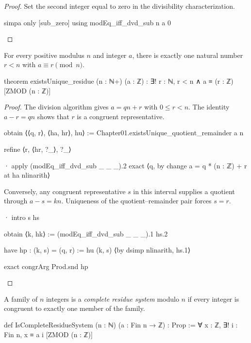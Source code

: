 \begin{proof}
  Set the second integer equal to zero in the divisibility characterization.

  \begin{lean}
    simpa only [sub_zero] using modEq_iff_dvd_sub n a 0
  \end{lean}
\end{proof}

\begin{theorem}
  \label{ent:thm:existsunique-residue}
  For every positive modulus $n$ and integer $a$, there is exactly one natural number $r<n$ with
  $a\equiv r\pmod n$.

  \begin{lean}
    theorem existsUnique_residue (n : ℕ+) (a : ℤ) :
        ∃! r : ℕ, r < n ∧ a ≡ (r : ℤ) [ZMOD (n : ℤ)]
  \end{lean}
\end{theorem}

\begin{proof}
  The division algorithm gives $a=qn+r$ with $0\le r<n$.
  The identity $a-r=qn$ shows that $r$ is a congruent representative.

  \begin{lean}
    obtain ⟨⟨q, r⟩, ⟨ha, hr⟩, hu⟩ := Chapter01.existsUnique_quotient_remainder a n

    refine ⟨r, ⟨hr, ?_⟩, ?_⟩

    · apply (modEq_iff_dvd_sub _ _ _).2
      exact ⟨q, by
          change a = q * (n : ℤ) + r at ha
          nlinarith⟩
  \end{lean}

  Conversely, any congruent representative $s$ in this interval supplies a quotient through
  $a-s=kn$.
  Uniqueness of the quotient--remainder pair forces $s=r$.

  \begin{lean}
    · intro s hs

      obtain ⟨k, hk⟩ := (modEq_iff_dvd_sub _ _ _).1 hs.2

      have hp : (k, s) = (q, r) := hu (k, s) ⟨by
          dsimp
          nlinarith, hs.1⟩

      exact congrArg Prod.snd hp
  \end{lean}
\end{proof}

\begin{definition}
  A family of $n$ integers is a \emph{complete residue system} modulo $n$ if every integer is
  congruent to exactly one member of the family.

  \begin{lean}
    def IsCompleteResidueSystem (n : ℕ) (a : Fin n → ℤ) : Prop :=
      ∀ x : ℤ, ∃! i : Fin n, x ≡ a i [ZMOD (n : ℤ)]
  \end{lean}
\end{definition}

